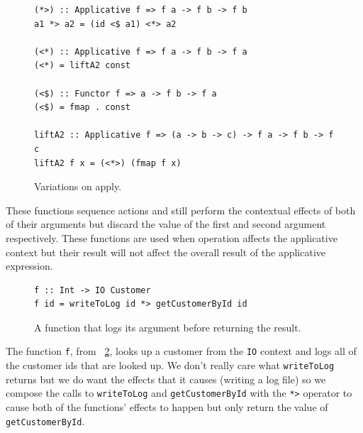 \begin{figure}[t]
\DIFdelbeginFL %
\DIFdelendFL \DIFaddbeginFL \begin{lstlisting}
(*>) :: Applicative f => f a -> f b -> f b
a1 *> a2 = (id <$ a1) <*> a2

(<*) :: Applicative f => f a -> f b -> f a
(<*) = liftA2 const

(<$) :: Functor f => a -> f b -> f a
(<$) = fmap . const

liftA2 :: Applicative f => (a -> b -> c) -> f a -> f b -> f c
liftA2 f x = (<*>) (fmap f x)

\end{lstlisting}
\DIFaddendFL \caption{Variations on apply.}
\label{appVars}
\end{figure}

These functions sequence actions and still perform the contextual effects of both of their arguments but discard the value of the first and second argument respectively. These functions are used when \DIFdelbegin {}\DIFdelend \DIFaddbegin {}\DIFaddend operation affects the applicative context but their result will not affect the overall result of the applicative expression. 

\begin{figure}[t]
\begin{lstlisting}
f :: Int -> IO Customer
f id = writeToLog id *> getCustomerById id
\end{lstlisting}
\caption{A function that logs its argument before returning the result.}
\label{logApp}
\end{figure}

The function \texttt{f}, from \DIFdelbegin {}\DIFdelend \DIFaddbegin {}\DIFaddend ~\ref{logApp}, looks up a customer \DIFdelbegin {}\DIFdelend \DIFaddbegin {}\DIFaddend from the \texttt{IO} context and logs all of the customer ids that are looked up. We don't really care what \texttt{writeToLog} returns but we do want the effects that it causes (writing a log file) so we compose the calls to \texttt{writeToLog} and \texttt{getCustomerById} with the \texttt{*>} operator to cause both of the functions' effects to happen but only return the value of \texttt{getCustomerById}.

